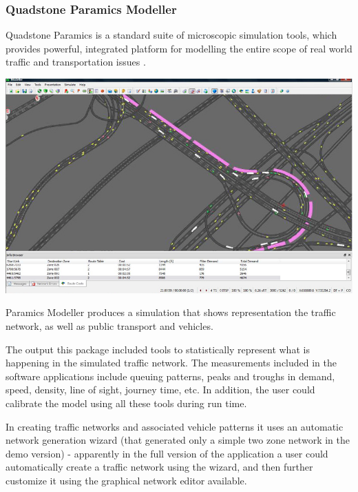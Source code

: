 \subsubsection{Quadstone Paramics Modeller}
	
	Quadstone Paramics is a standard suite of microscopic simulation tools, which provides powerful, integrated platform for modelling the entire scope of real world traffic and transportation issues \cite{EM3}.
	\begin{center}
	\includegraphics[scale=0.3]{./images/QPM.png}
	\end{center}
	
	Paramics Modeller produces a simulation that shows representation the traffic network, as well as public transport and vehicles\cite{EM3}.
	
	The output this package included tools to statistically represent what is happening in the simulated traffic network. The measurements included in the software applications include queuing patterns, peaks and troughs in demand, speed, density, line of sight, journey time, etc. In addition, the user could calibrate the model using all these tools during run time.
	
	In creating traffic networks and associated vehicle patterns it uses an automatic network generation wizard (that generated only a simple two zone network in the demo version) - apparently in the full version of the application a user could automatically create a traffic network using the wizard, and then further customize it using the graphical network editor available.
	
